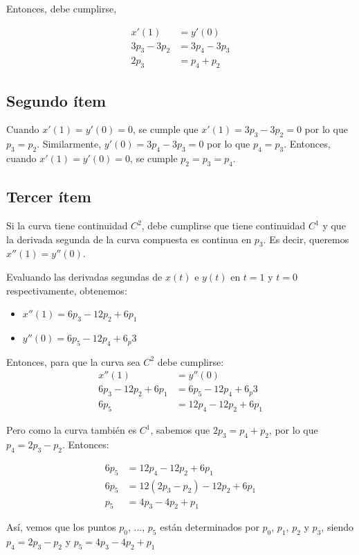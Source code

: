 \documentclass{article}
\begin{document}
Entonces, debe cumplirse,

$$
\begin{aligned}
x'(1) &= y'(0) \\
3p_3 - 3p_2 &= 3p_4 - 3p_3 \\
2p_3 &= p_4 +p_2
\end{aligned}
$$

\subsection*{Segundo ítem}
Cuando $x'(1) = y'(0) = 0$, se cumple que $x'(1) = 3p_3 - 3p_2 = 0$ por lo que $p_3 = p_2$. Similarmente, $y'(0) = 3p_4 - 3p_3 = 0$ por lo que $p_4 = p_3$. Entonces, cuando $x'(1) = y'(0) = 0$, se cumple $p_2 = p_3 = p_4$.

\subsection*{Tercer ítem}
Si la curva tiene continuidad $C^2$, debe cumplirse que tiene continuidad $C^1$ y que la derivada segunda de la curva compuesta es continua en $p_3$. Es decir, queremos $x''(1) = y''(0)$.

Evaluando las derivadas segundas de $x(t)$ e $y(t)$ en $t = 1$ y $t=0$ respectivamente, obtenemos:
\begin{itemize}
    \item $x''(1) = 6p_3 -12p_2 + 6p_1$
    \item $y''(0) = 6p_5 -12p_4 + 6_p3$
\end{itemize}

Entonces, para que la curva sea $C^2$ debe cumplirse:
$$
\begin{aligned}
x''(1) &= y''(0) \\
6p_3 -12p_2 + 6p_1 &= 6p_5 -12p_4 + 6_p3 \\
6p_5 &= 12p_4-12p_2+6p_1
\end{aligned}
$$

Pero como la curva también es $C^1$, sabemos que $2p_3 = p_4 +p_2$, por lo que $p_4 = 2p_3-p_2$. Entonces:

$$
\begin{aligned}
6p_5 &= 12p_4-12p_2+6p_1 \\
6p_5 &= 12(2p_3-p_2)-12p_2+6p_1 \\
p_5 &= 4p_3 - 4p_2 +p_1
\end{aligned}
$$

Así, vemos que los puntos $p_0$, ..., $p_5$ están determinados por $p_0$, $p_1$, $p_2$ y $p_3$, siendo  $p_4 = 2p_3-p_2$ y $p_5 = 4p_3 - 4p_2 +p_1$
\end{document}
